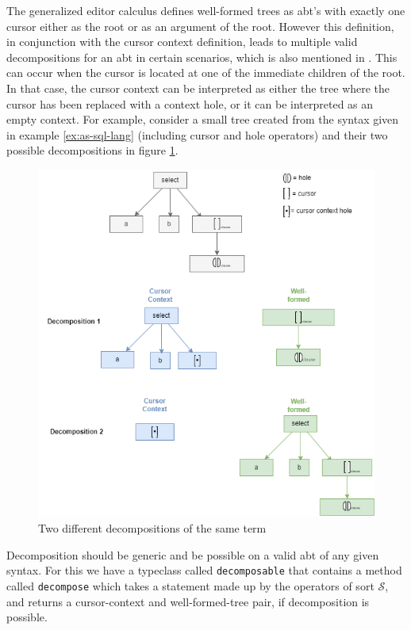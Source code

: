 The generalized editor calculus\cite{aalborg} defines well-formed trees as abt's
with exactly one cursor either as the root or as an argument of the root.
However this definition, in conjunction with the cursor context definition,
leads to multiple valid decompositions for an abt in certain scenarios,
which is also mentioned in \cite{aalborg}. This can occur when the cursor is located
at one of the immediate children of the root. In that case, the cursor context
can be interpreted as either the tree where the cursor has been replaced with a
context hole, or it can be interpreted as an empty context.
For example, consider a small tree created from the syntax given in
example \cref{ex:as-sql-lang} (including cursor and hole operators) and
their two possible decompositions in figure \cref{fig:sql-decomp-ex}.


\begin{figure}[H]
  \centering
  \includegraphics[width=\textwidth]{img/slq-decompose-ex.drawio.png}
  \caption{Two different decompositions of the same term}
  \label{fig:sql-decomp-ex}
\end{figure}

Decomposition should be generic and be possible on a valid abt of any given syntax.
For this we have a typeclass called \texttt{decomposable} that contains a
method called \texttt{decompose} which takes a statement made up by the
operators of sort $\mathcal{S}$, and returns a cursor-context and well-formed-tree pair,
if decomposition is possible.

